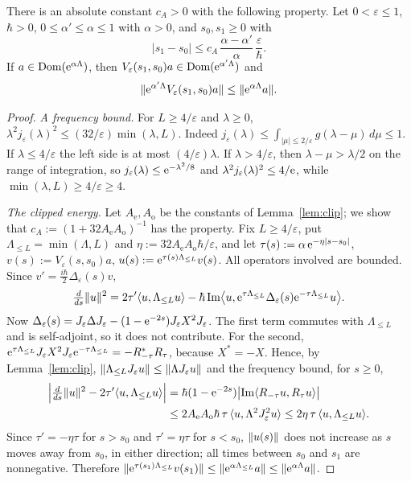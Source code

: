 \begin{proposition}\label{prop:a0}
There is an absolute constant $c_A>0$ with the following property. Let $0<\varepsilon\le1$, $\hbar>0$,
$0\le\alpha'\le\alpha\le1$ with $\alpha>0$, and $s_0,s_1\ge0$ with
\[
|s_1-s_0|\le c_A\,\frac{\alpha-\alpha'}{\alpha}\,\frac{\varepsilon}{\hbar}.
\]
If $a\in\operatorname{Dom}(\mathrm{e}^{\alpha\Lambda})$, then $V_\varepsilon(s_1,s_0)a\in\operatorname{Dom}(\mathrm{e}^{\alpha'\Lambda})$ and
\[
\lVert \mathrm{e}^{\alpha'\Lambda}V_\varepsilon(s_1,s_0)a\rVert\le\lVert \mathrm{e}^{\alpha\Lambda}a\rVert.
\]
\end{proposition}
\begin{proof}
\emph{A frequency bound.} For $L\ge4/\varepsilon$ and $\lambda\ge0$, $\lambda^2j_\varepsilon(\lambda)^2\le(32/\varepsilon)\min(\lambda,L)$.
Indeed $j_\varepsilon(\lambda)\le\int_{|\mu|\le2/\varepsilon}g(\lambda-\mu)\,d\mu\le1$. If $\lambda\le4/\varepsilon$ the left side is at most
$(4/\varepsilon)\lambda$. If $\lambda>4/\varepsilon$, then $\lambda-\mu>\lambda/2$ on the range of integration, so
$j_\varepsilon(\lambda)\le\mathrm{e}^{-\lambda^2/8}$ and $\lambda^2j_\varepsilon(\lambda)^2\le4/\mathrm{e}$, while $\min(\lambda,L)\ge4/\varepsilon\ge4$.

\emph{The clipped energy.} Let $A_{\mathrm e},A_{\mathrm o}$ be the constants of Lemma~\ref{lem:clip}; we show that $c_A:=(1+32A_{\mathrm e}A_{\mathrm o})^{-1}$
has the property. Fix $L\ge4/\varepsilon$, put $\Lambda_{\le L}=\min(\Lambda,L)$ and $\eta:=32A_{\mathrm e}A_{\mathrm o}\hbar/\varepsilon$, and let
$\tau(s):=\alpha\,\mathrm{e}^{-\eta|s-s_0|}$, $v(s):=V_\varepsilon(s,s_0)a$, $u(s):=\mathrm{e}^{\tau(s)\Lambda_{\le L}}v(s)$. All operators involved are bounded.
Since $v'=\tfrac{i\hbar}2\Delta_\varepsilon(s)v$,
\[
\tfrac{d}{ds}\lVert u\rVert^2=2\tau'\langle u,\Lambda_{\le L}u\rangle-\hbar\,\mathrm{Im}\bigl\langle u,\mathrm{e}^{\tau\Lambda_{\le L}}\Delta_\varepsilon(s)\mathrm{e}^{-\tau\Lambda_{\le L}}u\bigr\rangle .
\]
Now $\Delta_\varepsilon(s)=J_\varepsilon\Delta J_\varepsilon-(1-\mathrm{e}^{-2s})J_\varepsilon X^2J_\varepsilon$. The first term commutes with $\Lambda_{\le L}$ and is
self-adjoint, so it does not contribute. For the second, $\mathrm{e}^{\tau\Lambda_{\le L}}J_\varepsilon X^2J_\varepsilon\mathrm{e}^{-\tau\Lambda_{\le L}}=-R_{-\tau}^*R_\tau$,
because $X^*=-X$. Hence, by Lemma~\ref{lem:clip}, $\lVert \Lambda_{\le L}J_\varepsilon u\rVert\le\lVert \Lambda J_\varepsilon u\rVert$ and the frequency bound,
for $s\ge0$,
\[
\begin{aligned}
\Bigl|\tfrac{d}{ds}\lVert u\rVert^2-2\tau'\langle u,\Lambda_{\le L}u\rangle\Bigr|&=\hbar(1-\mathrm{e}^{-2s})\bigl|\mathrm{Im}\langle R_{-\tau}u,R_\tau u\rangle\bigr|\\ &\le2A_{\mathrm e}A_{\mathrm o}\hbar\,\tau\,\langle u,\Lambda^2J_\varepsilon^2u\rangle\le2\eta\,\tau\,\langle u,\Lambda_{\le L}u\rangle .
\end{aligned}
\]
Since $\tau'=-\eta\tau$ for $s>s_0$ and $\tau'=\eta\tau$ for $s<s_0$, $\lVert u(s)\rVert$ does not increase as $s$ moves away from $s_0$, in
either direction; all times between $s_0$ and $s_1$ are nonnegative. Therefore
$\lVert \mathrm{e}^{\tau(s_1)\Lambda_{\le L}}v(s_1)\rVert\le\lVert \mathrm{e}^{\alpha\Lambda_{\le L}}a\rVert\le\lVert \mathrm{e}^{\alpha\Lambda}a\rVert$.


\end{proof}
